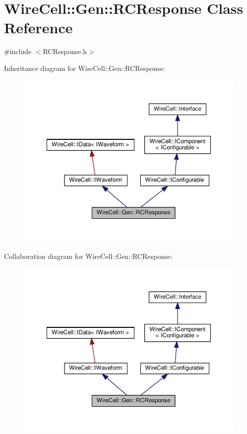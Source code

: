 \hypertarget{class_wire_cell_1_1_gen_1_1_r_c_response}{}\section{Wire\+Cell\+:\+:Gen\+:\+:R\+C\+Response Class Reference}
\label{class_wire_cell_1_1_gen_1_1_r_c_response}


{\ttfamily \#include $<$R\+C\+Response.\+h$>$}



Inheritance diagram for Wire\+Cell\+:\+:Gen\+:\+:R\+C\+Response\+:
\nopagebreak
\begin{figure}[H]
\begin{center}
\leavevmode
\includegraphics[width=350pt]{class_wire_cell_1_1_gen_1_1_r_c_response__inherit__graph}
\end{center}
\end{figure}


Collaboration diagram for Wire\+Cell\+:\+:Gen\+:\+:R\+C\+Response\+:
\nopagebreak
\begin{figure}[H]
\begin{center}
\leavevmode
\includegraphics[width=350pt]{class_wire_cell_1_1_gen_1_1_r_c_response__coll__graph}
\end{center}
\end{figure}
